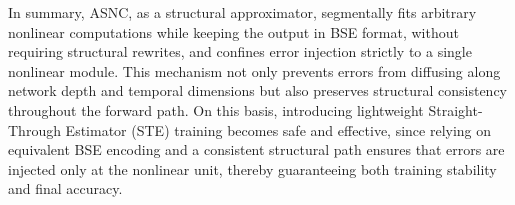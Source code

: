 \documentclass{article}
\theoremstyle{plain}
\theoremstyle{definition}
\theoremstyle{remark}
\begin{document}


In summary, ASNC, as a structural approximator, segmentally fits arbitrary nonlinear computations while keeping the output in BSE format, without requiring structural rewrites, and confines error injection strictly to a single nonlinear module. This mechanism not only prevents errors from diffusing along network depth and temporal dimensions but also preserves structural consistency throughout the forward path. On this basis, introducing lightweight Straight-Through Estimator (STE) training becomes safe and effective, since relying on equivalent BSE encoding and a consistent structural path ensures that errors are injected only at the nonlinear unit, thereby guaranteeing both training stability and final accuracy.
\end{document}
